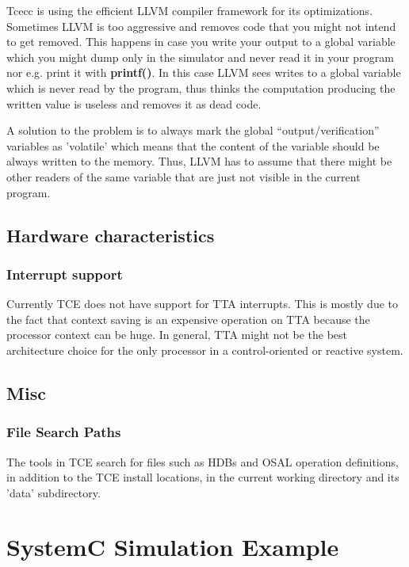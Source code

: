\documentclass[twoside]{tceusermanual}
\begin{document}
Tcecc is using the efficient LLVM compiler framework for its optimizations.
Sometimes LLVM is too aggressive and removes code that you might not
intend to get removed. This happens in case you write your output to a
global variable which you might dump only in the simulator and never read 
it in your program nor e.g. print it with \textbf{printf()}. In this case 
LLVM sees writes to a global variable which is never read by the program, 
thus thinks the computation producing the written value is useless and 
removes it as dead code.

A solution to the problem is to always mark the global ``output/verification'' 
variables as 'volatile' which means that the content of the variable should 
be always written to the memory. Thus, LLVM has to assume that there might 
be other readers of the same variable that are just not visible in the 
current program.

\section{Hardware characteristics}

\subsection{Interrupt support}

Currently TCE does not have support for TTA interrupts. This is mostly due to
the fact that context saving is an expensive operation on TTA because the
processor context can be huge. In general, TTA might not be the best
architecture choice for the only processor in a control-oriented or reactive 
system.

\section{Misc}

\subsection{File Search Paths}

The tools in TCE search for files such as HDBs and OSAL operation definitions,
in addition to the TCE install locations, in the current working directory and
its 'data' subdirectory. 

\chapter{SystemC Simulation Example}
\label{appendix:SystemCExample}
\end{document}
